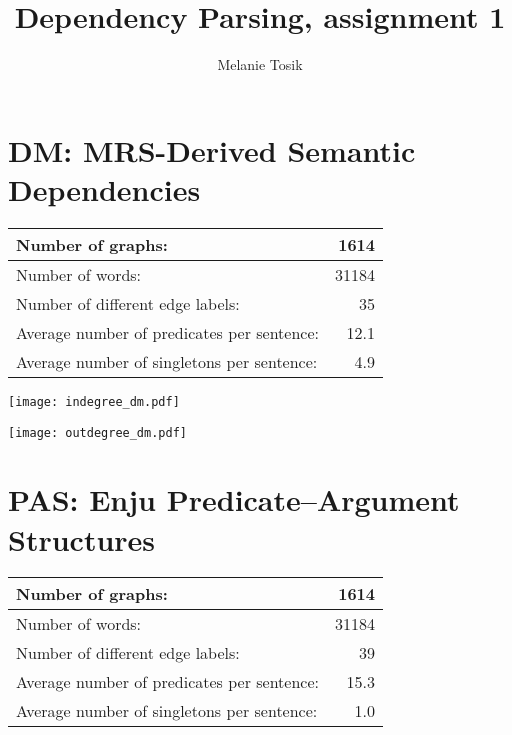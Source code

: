 \documentclass[11pt,a4paper]{article}
\author{Melanie Tosik}
\title{Dependency Parsing, assignment 1}
\begin{document}
\maketitle
{}


\section{DM: MRS-Derived Semantic Dependencies}

\begin{tabular}{lr}
\hline\hline
Number of graphs: & 1614\\ 
\hline
Number of words: &  31184\\ 
\hline
Number of different edge labels: & 35\\ 
\hline 
Average number of predicates per sentence:  & 12.1\\ 
\hline 
Average number of singletons per sentence: & 4.9\\
\hline\hline
\end{tabular}
\vspace{10pt}

\begin{center}
\texttt{[image: indegree\_dm.pdf]}

\texttt{[image: outdegree\_dm.pdf]}
\end{center}


\section{PAS: Enju Predicate--Argument Structures}

\begin{tabular}{lr}
\hline\hline
Number of graphs: & 1614\\ 
\hline
Number of words: &  31184\\ 
\hline
Number of different edge labels: & 39\\ 
\hline 
Average number of predicates per sentence:  & 15.3\\ 
\hline 
Average number of singletons per sentence: & 1.0\\
\hline\hline
\end{tabular}
\vspace{10pt}
\end{document}
